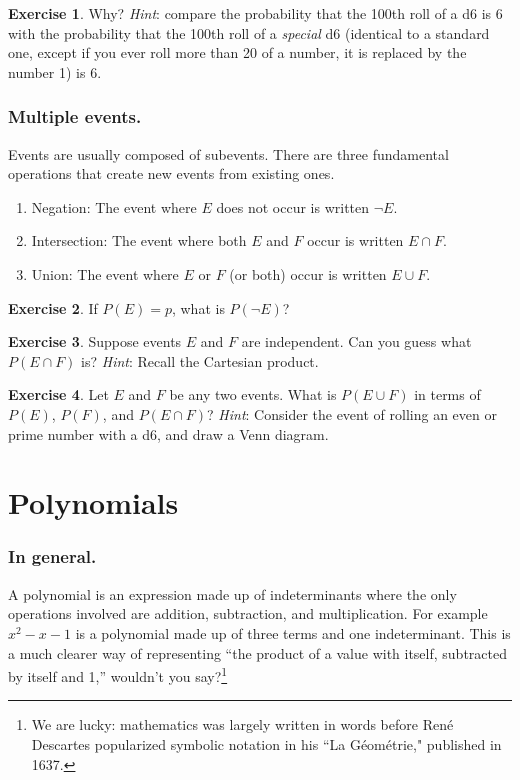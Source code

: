 \documentclass{book}
\theoremstyle{definition}
\newtheorem{exercise}{Exercise}[chapter]
\theoremstyle{colonstylebf}
\begin{document}
\begin{exercise}
Why? \emph{Hint}: compare the probability that the 100th roll of a d6 is 6 with the probability that the 100th roll of a \emph{special} d6 (identical to a standard one, except if you ever roll more than 20 of a number, it is replaced by the number 1) is 6.
\end{exercise}


\subsubsection*{Multiple events.}
Events are usually composed of subevents. There are three fundamental operations that create new events from existing ones.
\begin{enumerate}[label = (\arabic*)]
\item Negation: The event where $E$ does not occur is written $\neg E$.
\item\label{intersection} Intersection:
The event where both $E$ and $F$ occur is written $\displaystyle E \cap F$.
\item Union:  The event where $E$ or $F$ (or both) occur is written $E \cup F$.
\end{enumerate}

\begin{exercise}\label{q:neg}
If $P(E) = p$, what is $P(\neg E)$?
\end{exercise}
\begin{exercise}\label{q:cap}
Suppose events $E$ and $F$ are independent. Can you guess what $\displaystyle P(E \cap F)$ is? \emph{Hint}: Recall the Cartesian product.
\end{exercise}
\begin{exercise}\label{q:cup}
Let $E$ and $F$ be any two events. What is $P(E \cup F)$ in terms of $P(E)$, $P(F)$, and $\displaystyle P(E \cap F)$? \emph{Hint}: Consider the event of rolling an even or prime number with a d6, and draw a Venn diagram.
\end{exercise}


\section{Polynomials}
\subsubsection*{In general.}
A polynomial is an expression made up of indeterminants where the only operations involved are addition, subtraction, and multiplication. For example $x^2 - x - 1$ is a polynomial made up of three terms and one indeterminant. This is a much clearer way of representing ``the product of a value with itself, subtracted by itself and 1,'' wouldn't you say?\footnote{We are lucky: mathematics was largely written in words before Ren\'e Descartes popularized symbolic notation in his ``La G\'eom\'etrie," published in 1637.}
\end{document}
